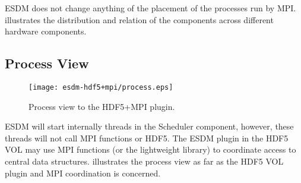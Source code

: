 ESDM does not change anything of the placement of the processes run by MPI.
 illustrates the distribution and relation of the components across different hardware components.


\subsection{Process View}

\begin{figure}
	\centering
	\texttt{[image: esdm-hdf5+mpi/process.eps]}
	\caption{Process view to the HDF5+MPI plugin.}
	\label{fig:esdm hdf5 process view}
\end{figure}

ESDM will start internally threads in the Scheduler component, however, these threads will not call MPI functions or HDF5.
The ESDM plugin in the HDF5 VOL may use MPI functions (or the lightweight library) to coordinate access to central data structures.
 illustrates the process view as far as the HDF5 VOL plugin and MPI coordination is concerned.
